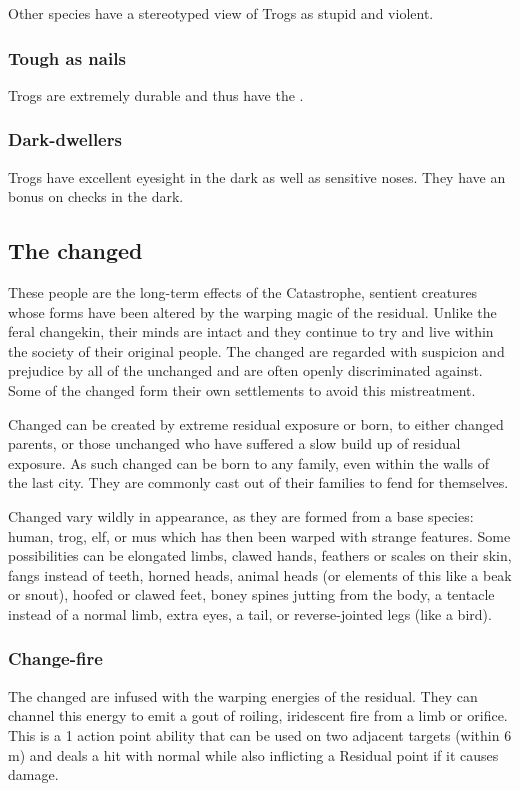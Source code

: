 \documentclass[a4paper,11pt,oneside]{book}
\newcommand{\textlf}[1]{\textbf{\titlecap{#1}}}
\begin{document}
Other species have a stereotyped view of Trogs as stupid and violent.  

\subsubsection*{Tough as nails}
Trogs are extremely durable and thus have the \textlf{hardy perk}.

\subsubsection*{Dark-dwellers}
Trogs have excellent eyesight in the dark as well as sensitive noses. They have an \textlf{edge} bonus on \textlf{awareness} checks in the dark.


\subsection{The changed}
These people are the long-term effects of the Catastrophe, sentient creatures whose forms have been altered by the warping magic of the residual. Unlike the feral changekin, their minds are intact and they continue to try and live within the society of their original people. The changed are regarded with suspicion and prejudice by all of the unchanged and are often openly discriminated against. Some of the changed form their own settlements to avoid this mistreatment. 

Changed can be created by extreme residual exposure or born, to either changed parents, or those unchanged who have suffered a slow build up of residual exposure. As such changed can be born to any family, even within the walls of the last city. They are commonly cast out of their families to fend for themselves.

Changed vary wildly in appearance, as they are formed from a base species: human, trog, elf, or mus which has then been warped with strange features. Some possibilities can be elongated limbs, clawed hands, feathers or scales on their skin, fangs instead of teeth, horned heads, animal heads (or elements of this like a beak or snout), hoofed or clawed feet, boney spines jutting from the body, a tentacle instead of a normal limb, extra eyes, a tail, or reverse-jointed legs (like a bird).

\subsubsection*{Change-fire}
The changed are infused with the warping energies of the residual. They can channel this energy to emit a gout of roiling, iridescent fire from a limb or orifice. This is a 1 action point ability that can be used on two adjacent targets (within 6 m) and deals a hit with normal \textlf{lethality} while also inflicting a Residual point if it causes damage. 
\end{document}
